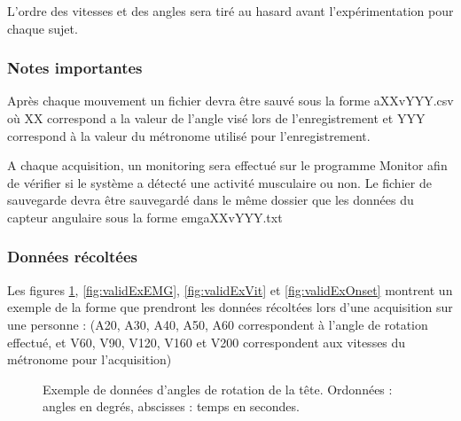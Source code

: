 \documentclass[letterpaper, twoside, 12pt, memoire, creativecommons, hyperref]{thETS}
\begin{document}
L’ordre des vitesses et des angles sera tiré au hasard avant l’expérimentation pour chaque sujet.

\subsubsection{Notes importantes}

Après chaque mouvement un fichier devra être sauvé sous la forme aXXvYYY.csv où XX correspond a la valeur de l’angle visé lors de l’enregistrement et YYY correspond à la valeur du métronome utilisé pour l’enregistrement.

A chaque acquisition, un monitoring sera effectué sur le programme Monitor afin de vérifier si le système a détecté une activité musculaire ou non. Le fichier de sauvegarde devra être sauvegardé dans le même dossier que les données du capteur angulaire sous la forme emgaXXvYYY.txt

\subsubsection{Données récoltées}

Les figures \ref{fig:validExAng}, \ref{fig:validExEMG}, \ref{fig:validExVit} et \ref{fig:validExOnset} montrent un exemple de la forme que prendront les données récoltées lors d’une acquisition sur une personne : (A20, A30, A40, A50, A60 correspondent à l’angle de rotation effectué, et V60, V90, V120, V160 et V200 correspondent aux vitesses du métronome pour l’acquisition)

\begin{figure}
	\centering
	\caption{Exemple de données d'angles de rotation de la tête. Ordonnées : angles en degrés, abscisses : temps en secondes.}
	\label{fig:validExAng}
\end{figure}
\end{document}

